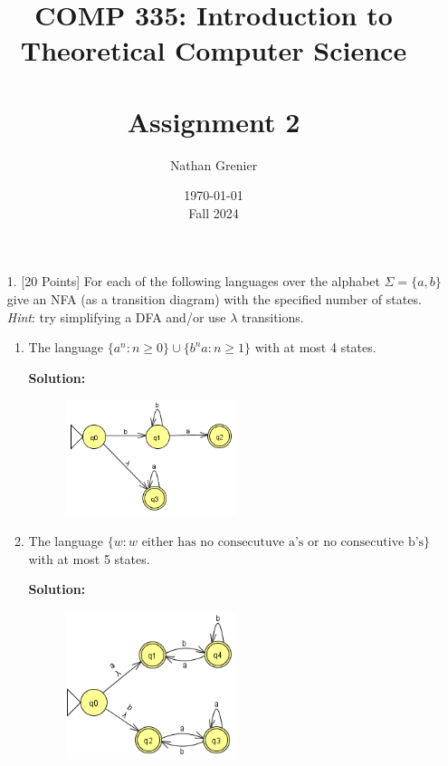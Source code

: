 \documentclass[12pt]{article}
\title{COMP 335: Introduction to Theoretical Computer Science\\
\ \\
Assignment 2}
\author{Nathan Grenier}
\date{\today \\ Fall 2024}
\begin{document}
\begin{spacing}{1.5}
      \maketitle

      \newpage

      \begin{enumerate}

            \item[1.] [20 Points] For each of the following languages over the alphabet $\Sigma = \{a,b\}$ give an NFA (as a transition diagram) with the specified number of states. \emph{Hint}: try simplifying a DFA and/or use $\lambda$ transitions.

                  \begin{enumerate}
                        \item The language $\{a^n : n \geq 0 \} \cup \{b^na : n \geq 1 \}$ with at most 4 states.

                              \textbf{Solution:}

                              \begin{figure}[h!]
                                    \centering
                                    \includegraphics[width=0.5\textwidth]{img/q1/q1a.png}
                              \end{figure}

                        \item The language $\{w : w \text{ either has no consecutuve a's or no consecutive b's} \}$ with at most 5 states.

                              \textbf{Solution:}

                              \begin{figure}[h!]
                                    \centering
                                    \includegraphics[width=0.5\textwidth]{img/q1/q1b.png}
                              \end{figure}


\end{enumerate}
\end{enumerate}
\end{spacing}
\end{document}
